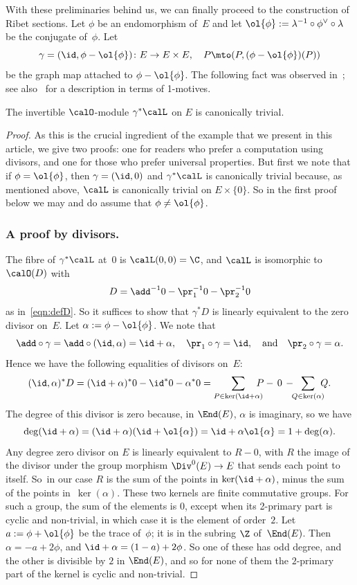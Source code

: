 With these preliminaries behind us, we can finally proceed to the
construction of Ribet sections. Let $\phi$ be an endomorphism of~$E$
and let $\ol{\phi}:=\lambda^{-1}\circ\phi^\vee\circ\lambda$ be the
conjugate of~$\phi$. Let
\[
\gamma=
(\id,\phi-\ol{\phi})\colon
E\to E\times E, \quad P\mto (P,(\phi-\ol{\phi})(P))
\]
be the graph map attached to $\phi-\ol{\phi}$. The following fact was
observed in~\cite{Breen}; see also~\cite{Jacquinot-Ribet} for
a description in terms of 1-motives.
\begin{Proposition}\label{prop:t_phi}
The invertible $\calO$-module $\gamma^*\calL$ on $E$ is canonically trivial.
\end{Proposition}
\begin{proof}
As this is the crucial ingredient of the example that we present in
this article, we give two proofs: one for readers who prefer a
computation using divisors, and one for those who prefer universal
properties. But first we note that if $\phi=\ol{\phi}$, then
$\gamma=(\id,0)$ and $\gamma^*\calL$ is canonically trivial because,
as mentioned above, $\calL$ is canonically trivial on
$E\times\{0\}$. So in the first proof below we may and do assume that
$\phi\neq\ol{\phi}$.

\subsubsection*{A proof by divisors.} The fibre of
$\gamma^*\calL$ at~$0$ is $\calL(0,0)=\C$, and $\calL$ is
isomorphic to~$\calO(D)$ with
\[
D=\add^{-1}0-\pr_1^{-1}0-\pr_2^{-1}0
\]
as in~\eqref{eqn:defD}. So it suffices to show that $\gamma^*D$ is
linearly equivalent to the zero divisor on~$E$. Let
$\alpha:=\phi-\ol{\phi}$. We note that
\[
\add\circ\gamma = \add\circ(\id,\alpha) = \id+\alpha,\quad
\pr_1\circ\gamma = \id,\quad\text{and}\quad
\pr_2\circ\gamma = \alpha.
\]
Hence we have the following equalities of divisors on~$E$:
\[
(\id,\alpha)^*D = (\id+\alpha)^*0 - \id^*0 - \alpha^*0
= \sum_{P\in\ker(\id+\alpha)}\hspace*{-3mm}P -\, 0\, - {}\hspace*{-2mm}\sum_{Q\in\ker(\alpha)}\hspace*{-2mm}Q.
\]
The degree of this divisor is zero because, in $\End(E)$, $\alpha$ is
imaginary, so we have
\[
\deg(\id+\alpha) =
(\id+\alpha)(\id+\ol{\alpha})=\id+\alpha\ol{\alpha}
=1+\deg(\alpha).
\]
Any degree zero divisor on $E$ is linearly equivalent to $R-0$, with
$R$ the image of the divisor under the group morphism $\Div^0(E) \to
E$ that sends each point to itself. So~in our case $R$ is the sum of
the points in $\ker(\id+\alpha)$, minus the sum of the points
in~$\ker(\alpha)$. These two kernels are finite commutative
groups. For such a group, the sum of the elements is $0$, except when
its 2-primary part is cyclic and non-trivial, in which case it is the
element of order~$2$. Let $a:=\phi+\ol{\phi}$ be the trace
of~$\phi$; it is in the subring $\Z$ of~$\End(E)$. Then
$\alpha=-a+2\phi$, and $\id+\alpha=(1-a)+2\phi$. So one of these has
odd degree, and the other is divisible by $2$ in $\End(E)$, and so
for none of them the $2$-primary part of the kernel is cyclic and
non-trivial.


\end{proof}
